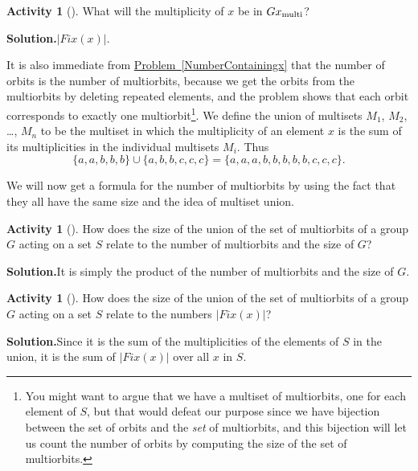\documentclass[10pt,]{book}
\theoremstyle{plain}
\theoremstyle{definition}
\newtheorem{activity}[project]{Activity}
\numberwithin{equation}{chapter}
\begin{document}
\begin{activity}[]\label{activity-291}
What will the multiplicity of \(x\) be in \(Gx_{\mbox{\scriptsize multi} }\)?%
\par\medskip\noindent%
\textbf{Solution.}\quad \(|{ Fix}(x)|\).%
\end{activity}
It is also immediate from \hyperref[NumberContainingx]{Problem~\ref{NumberContainingx}} that the number of orbits is the number of multiorbits, because we get the orbits from the multiorbits by deleting repeated elements, and the problem shows that each orbit corresponds to exactly one multiorbit\footnote{You might want to argue that we have a multiset of multiorbits, one for each element of \(S\), but that would defeat our purpose since we have  bijection between the set of orbits and the \emph{set} of multiorbits, and this bijection will let us count the number of orbits by computing the size of the set of multiorbits.\label{fn-22}}. We define the union of multisets \(M_1\), \(M_2\), \dots{}, \(M_n\) to be the multiset in which the multiplicity of an element \(x\) is the sum of its multiplicities in the individual multisets \(M_i\). Thus%
\begin{equation*}
\{a,a,b,b,b\}\cup \{a,b,b,c,c,c\}=\{a,a,a,b,b,b,b,b,c,c,c\}.
\end{equation*}
%
\par
We will now get a formula for the number of multiorbits by using the fact that they all have the same size and the idea of multiset union.%
\begin{activity}[]\label{numbermultiorbits1}
How does the size of the union of the set of multiorbits of a group \(G\) acting on a set \(S\) relate to the number of multiorbits and the size of \(G\)?%
\par\medskip\noindent%
\textbf{Solution.}\quad It is simply the product of the number of multiorbits and the size of \(G\).%
\end{activity}
\begin{activity}[]\label{numbermultiorbits2}
How does the size of the union of the set of multiorbits of a group \(G\) acting on a set \(S\) relate to the numbers \(|{
Fix}(x)|\)?%
\par\medskip\noindent%
\textbf{Solution.}\quad Since it is the sum of the multiplicities of the elements of \(S\) in the union, it is the sum of \(|{ Fix}(x)|\) over all \(x\) in \(S\).%
\end{activity}
\end{document}
